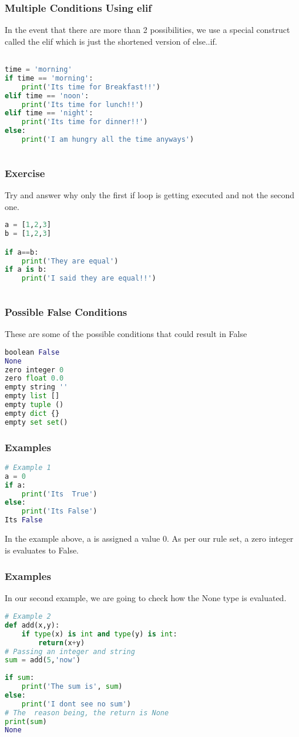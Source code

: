 \documentclass{beamer}
\begin{document}
\begin{frame}[fragile]
\frametitle{Multiple Conditions Using elif}
In the event that there are more than 2 possibilities, we use a special construct called the elif which is just the shortened version of else..if.
\begin{lstlisting}[language=Python]

time = 'morning'
if time == 'morning':
    print('Its time for Breakfast!!')
elif time == 'noon':
    print('Its time for lunch!!')
elif time == 'night':
    print('Its time for dinner!!')
else:
    print('I am hungry all the time anyways')
	
\end{lstlisting}
\end{frame}

\begin{frame}[fragile]
\frametitle{Exercise}
Try and answer why only the first if loop is getting executed and not the second one.
\begin{lstlisting}[language=Python]
a = [1,2,3]
b = [1,2,3]

if a==b:
    print('They are equal')
if a is b:
    print('I said they are equal!!')
	
\end{lstlisting}
\end{frame}


\begin{frame}[fragile]
\frametitle{Possible False Conditions}
These are some of the possible conditions that could result in False
\begin{lstlisting}[language=Python]
boolean False
None
zero integer 0
zero float 0.0
empty string ''
empty list []
empty tuple ()
empty dict {}
empty set set()
\end{lstlisting}
\end{frame}

\begin{frame}[fragile]
\frametitle{Examples}
\begin{lstlisting}[language=Python]
# Example 1
a = 0
if a:
	print('Its  True')
else:
	print('Its False')
Its False
\end{lstlisting}
In the example above, a is assigned a value 0.
As per our rule set, a zero integer is evaluates to False.
\end{frame}

\begin{frame}[fragile]
\frametitle{Examples}
In our second example, we are going to check how the None type is evaluated.
\begin{lstlisting}[language=Python]
# Example 2
def add(x,y):
    if type(x) is int and type(y) is int:
        return(x+y)
# Passing an integer and string        
sum = add(5,'now') 
    
if sum:
    print('The sum is', sum)
else:
    print('I dont see no sum')
# The  reason being, the return is None
print(sum)
None
\end{lstlisting}
\end{frame}
\end{document}
